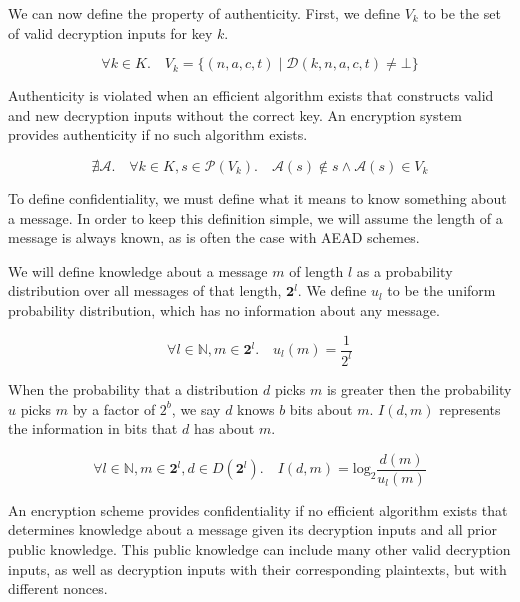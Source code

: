 We can now define the property of authenticity. First, we define $V_k$ to be the
set of valid decryption inputs for key $k$.

\begin{equation}
    \forall k \in K.\quad
    V_k = \{ (n, a, c, t) \mid \mathcal{D}(k, n, a, c, t) \neq \bot \}
\end{equation}

Authenticity is violated when an efficient algorithm exists that constructs
valid and new decryption inputs without the correct key. An encryption system
provides authenticity if no such algorithm exists.

\begin{equation}
    \nexists \mathcal{A}.\quad \forall k \in K, s \in \mathcal{P}(V_k).\quad
    \mathcal{A}(s) \notin s \wedge \mathcal{A}(s) \in V_k
\end{equation}

To define confidentiality, we must define what it means to know something about
a message. In order to keep this definition simple, we will assume the length of
a message is always known, as is often the case with AEAD schemes.

We will define knowledge about a message $m$ of length $l$ as a probability
distribution over all messages of that length, $\mathbf{2}^l$. We define $u_l$
to be the uniform probability distribution, which has no information about any
message.

\begin{equation}
    \forall l \in \mathbb{N}, m \in \mathbf{2}^l.\quad u_l(m) = \frac{1}{2^l}
\end{equation}

When the probability that a distribution $d$ picks $m$ is greater then the
probability $u$ picks $m$ by a factor of $2^b$, we say $d$ knows $b$ bits about
$m$. $I(d, m)$ represents the information in bits that $d$ has about $m$.

\begin{equation}
    \forall l \in \mathbb{N}, m \in \mathbf{2}^l, d \in D(\mathbf{2}^l).\quad
    I(d, m) = \textrm{log}_2 \frac{d(m)}{u_l(m)}
\end{equation}

An encryption scheme provides confidentiality if no efficient algorithm exists
that determines knowledge about a message given its decryption inputs and all
prior public knowledge. This public knowledge can include many other valid
decryption inputs, as well as decryption inputs with their corresponding
plaintexts, but with different nonces.

